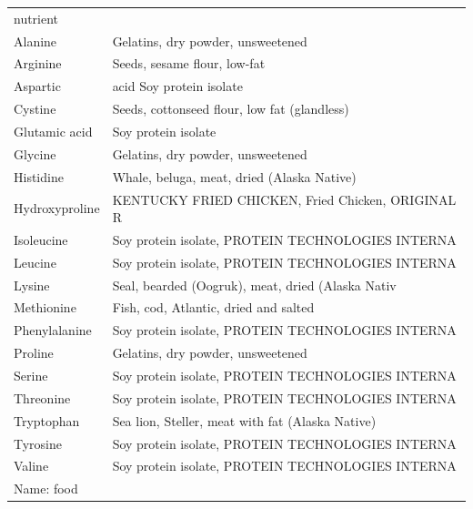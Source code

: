 \par\quad\begin{tabular}{ll}
nutrient\\
Alanine &Gelatins, dry powder, unsweetened\\
Arginine& Seeds, sesame flour, low-fat\\
Aspartic& acid Soy protein isolate\\
Cystine& Seeds, cottonseed flour, low fat (glandless)\\
Glutamic acid& Soy protein isolate\\
Glycine& Gelatins, dry powder, unsweetened\\
Histidine& Whale, beluga, meat, dried (Alaska Native)\\
Hydroxyproline& KENTUCKY FRIED CHICKEN, Fried Chicken, ORIGINAL R\\
Isoleucine& Soy protein isolate, PROTEIN TECHNOLOGIES INTERNA\\
Leucine& Soy protein isolate, PROTEIN TECHNOLOGIES INTERNA\\
Lysine& Seal, bearded (Oogruk), meat, dried (Alaska Nativ\\
Methionine& Fish, cod, Atlantic, dried and salted\\
Phenylalanine& Soy protein isolate, PROTEIN TECHNOLOGIES INTERNA\\
Proline& Gelatins, dry powder, unsweetened\\
Serine &Soy protein isolate, PROTEIN TECHNOLOGIES INTERNA\\
Threonine& Soy protein isolate, PROTEIN TECHNOLOGIES INTERNA\\
Tryptophan& Sea lion, Steller, meat with fat (Alaska Native)\\
Tyrosine &Soy protein isolate, PROTEIN TECHNOLOGIES INTERNA\\
Valine& Soy protein isolate, PROTEIN TECHNOLOGIES INTERNA\\
Name: food

\par\end{tabular}
